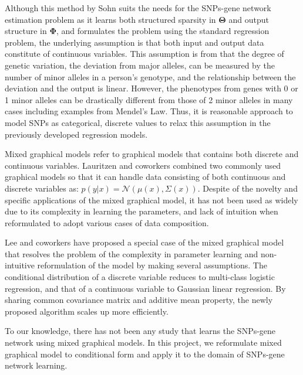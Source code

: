 \documentclass{article}
\begin{document}
Although this method by Sohn suits the needs for the SNPs-gene network estimation problem as it learns both structured sparsity in $\mathbf{\Theta}$ and output structure in $\mathbf{\Phi}$, and formulates the problem using the standard regression problem, the underlying assumption is that both input and output data constitute of continuous variables. This assumption is from that the degree of genetic variation, the deviation from major alleles, can be measured by the number of minor alleles in a person's genotype, and the relationship between the deviation and the output is linear. However, the phenotypes from genes with 0 or 1 minor alleles can be drastically different from those of 2 minor alleles in many cases including examples from Mendel's Law.  Thus, it is reasonable approach to model SNPs as categorical, discrete values to relax this assumption in the previously developed regression models. 


Mixed graphical models refer to graphical models that contains both discrete and continuous variables. Lauritzen and coworkers \cite{lauritzen1989graphical} combined two commonly used graphical models so that it can handle data consisting of both continuous and discrete variables as: $p(y|x) = \mathcal{N}(\mu(x), \Sigma(x))$. Despite of the novelty and specific applications of the mixed graphical model, it has not been used as widely due to its complexity in learning the parameters, and lack of intuition when reformulated to adopt various cases of data composition.


Lee and coworkers \cite{lee2013structure} have proposed a special case of the mixed graphical model that resolves the problem of the complexity in parameter learning and non-intuitive reformulation of the model by making several assumptions.
The conditional distribution of a discrete variable reduces to multi-class logistic regression, and that of a continuous variable to Gaussian linear regression.
By sharing common covariance matrix and additive mean property, the newly proposed algorithm scales up more efficiently.


To our knowledge, there has not been any study that learns the SNPs-gene network using mixed graphical models. 
In this project, we reformulate mixed graphical model to conditional form and apply it to the domain of SNPs-gene network learning.
\end{document}
